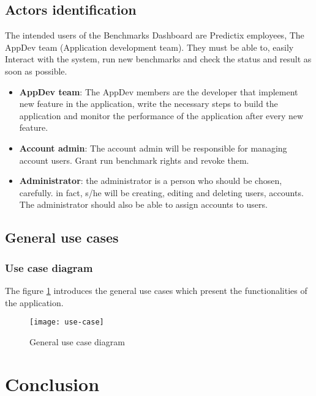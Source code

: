 \subsection{Actors identification}
The intended users of the Benchmarks Dashboard are Predictix employees, The
AppDev team (Application development team). They must be able to, easily
Interact with the system, run new benchmarks and check the status and result as
soon as possible.

\begin{itemize}
  \item{\textbf{AppDev team}}: The AppDev members are the developer that implement new
    feature in the application, write the necessary steps to build the
    application and monitor the performance of the application after every new
    feature.
  \item{\textbf{Account admin}}: The account admin will be responsible for managing
    account users. Grant run benchmark rights and revoke them.
  \item{\textbf{Administrator}}: the administrator is a person who should be chosen,
    carefully. in fact, s/he will be creating, editing and deleting users,
    accounts. The administrator should also be able to assign accounts to users.
\end{itemize}

\subsection{General use cases}
\subsubsection{Use case diagram}
The figure \hyperref[fig:use-case]{\ref{fig:use-case}} introduces the general use cases which present the
functionalities of the application.

\begin{figure}[h]
  \center
  \texttt{[image: use-case]}
  \caption{General use case diagram}
\label{fig:use-case}
\end{figure}


\section*{Conclusion}
